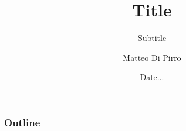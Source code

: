 \documentclass{beamer}
\title{Title}
\subtitle{\newline Subtitle}
\author{Matteo Di Pirro}
\date{Date...}
\institute{University of Padova}
\begin{document}
\newcommand{\turnOffNumbers}{true} %

\begin{frame}[noframenumbering]
\titlepage
\end{frame}

\let\turnOffNumbers\empty
\begin{frame}
	\frametitle{Outline}
	\tableofcontents
\end{frame}

%

\appendix
\makethanks
\renewcommand{\turnOffNumbers}{true} %
\end{document}
